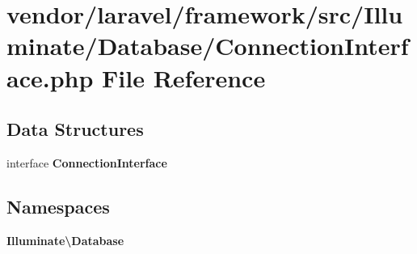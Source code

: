 \section{vendor/laravel/framework/src/\+Illuminate/\+Database/\+Connection\+Interface.php File Reference}
\label{_connection_interface_8php}
\subsection*{Data Structures}
\begin{DoxyCompactItemize}
\item 
interface {\bf Connection\+Interface}
\end{DoxyCompactItemize}
\subsection*{Namespaces}
\begin{DoxyCompactItemize}
\item 
 {\bf Illuminate\textbackslash{}\+Database}
\end{DoxyCompactItemize}

